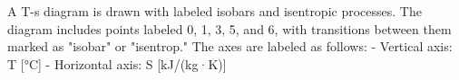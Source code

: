 A T-s diagram is drawn with labeled isobars and isentropic processes. The diagram includes points labeled 0, 1, 3, 5, and 6, with transitions between them marked as "isobar" or "isentrop." The axes are labeled as follows:  
- Vertical axis: T [°C]  
- Horizontal axis: S [kJ/(kg·K)]
